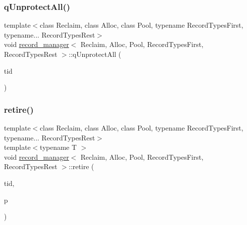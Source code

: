 \mbox{\label{classrecord__manager_aed181e88c726f16799c0a6d8a1c5b852}} 
\subsubsection{\texorpdfstring{q\+Unprotect\+All()}{qUnprotectAll()}}
{\footnotesize\ttfamily template$<$class Reclaim, class Alloc, class Pool, typename Record\+Types\+First, typename... Record\+Types\+Rest$>$ \\
void \hyperlink{classrecord__manager}{record\+\_\+manager}$<$ Reclaim, Alloc, Pool, Record\+Types\+First, Record\+Types\+Rest $>$\+::q\+Unprotect\+All (\begin{DoxyParamCaption}\item[{const int}]{tid }\end{DoxyParamCaption})\hspace{0.3cm}{\ttfamily [inline]}}

\mbox{\label{classrecord__manager_a630aebebde7703d3beec174beb1a3592}} 
\subsubsection{\texorpdfstring{retire()}{retire()}}
{\footnotesize\ttfamily template$<$class Reclaim, class Alloc, class Pool, typename Record\+Types\+First, typename... Record\+Types\+Rest$>$ \\
template$<$typename T $>$ \\
void \hyperlink{classrecord__manager}{record\+\_\+manager}$<$ Reclaim, Alloc, Pool, Record\+Types\+First, Record\+Types\+Rest $>$\+::retire (\begin{DoxyParamCaption}\item[{const int}]{tid,  }\item[{T $\ast$const}]{p }\end{DoxyParamCaption})\hspace{0.3cm}{\ttfamily [inline]}}

\mbox{\label{classrecord__manager_af3a8edecda7de21633ea71aa62a3a0b7}} 
